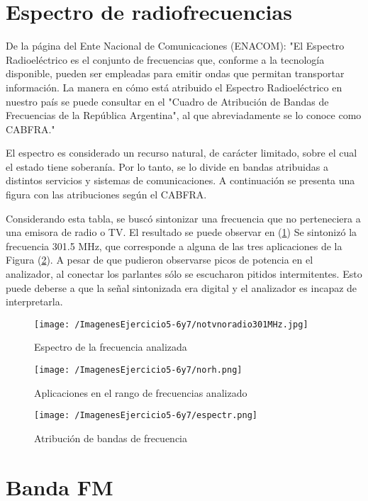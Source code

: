 \section{Espectro de radiofrecuencias}
De la página del Ente Nacional de Comunicaciones (ENACOM): "El Espectro Radioeléctrico es el conjunto de frecuencias que, conforme a la tecnología disponible, pueden ser empleadas para emitir ondas que permitan transportar información. La manera en cómo está atribuido el Espectro Radioeléctrico en nuestro país se puede consultar en el "Cuadro de Atribución de Bandas de Frecuencias de la República Argentina", al que abreviadamente se lo conoce como CABFRA."

El espectro es considerado un recurso natural, de carácter limitado,  sobre el cual el estado tiene soberanía. Por lo tanto, se lo divide en bandas atribuidas a distintos servicios y sistemas de comunicaciones. A continuación se presenta una figura con las atribuciones según el CABFRA. 

Considerando esta tabla, se buscó sintonizar una frecuencia que no perteneciera a una emisora de radio o TV. El resultado se puede observar en (\ref{fig:hola}) Se sintonizó la frecuencia 301.5 MHz, que corresponde a alguna de las tres aplicaciones de la Figura (\ref{fig:noradionitelev}). A pesar de que pudieron observarse picos de potencia en el analizador, al conectar los parlantes sólo se escucharon pitidos intermitentes. Esto puede deberse a que la señal sintonizada era digital y el analizador es incapaz de interpretarla.

\begin{figure}[H]
	\centering
	\texttt{[image: /ImagenesEjercicio5-6y7/notvnoradio301MHz.jpg]}
\caption{Espectro de la frecuencia analizada}
	\label{fig:hola}
\end{figure}

\begin{figure}[H]
	\centering
	\texttt{[image: /ImagenesEjercicio5-6y7/norh.png]}
\caption{Aplicaciones en el rango de frecuencias analizado}
	\label{fig:noradionitelev}
\end{figure}

\begin{figure}[H]
	\centering
	\texttt{[image: /ImagenesEjercicio5-6y7/espectr.png]}
	\caption{Atribución de bandas de frecuencia}
	\label{fig:esqcond}
\end{figure}

\section{Banda FM}

